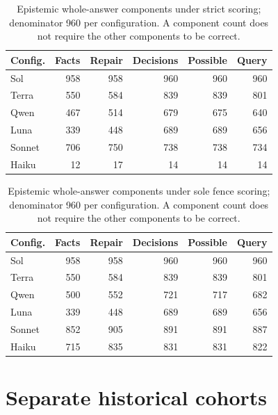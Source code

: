\documentclass[a4paper,preprint,12pt,numbers,nopreprintline]{elsarticle}
\begin{document}
\begin{table}[htbp]\centering\scriptsize
\caption{Epistemic whole-answer components under strict scoring; denominator 960 per configuration. A component count does not require the other components to be correct.}\label{tab:components-epistemic-primary}
\setlength{\tabcolsep}{3pt}
\begin{tabular}{lrrrrr}\toprule
Config. & Facts & Repair & Decisions & Possible & Query\\\midrule
Sol & 958 & 958 & 960 & 960 & 960\\
Terra & 550 & 584 & 839 & 839 & 801\\
Qwen & 467 & 514 & 679 & 675 & 640\\
Luna & 339 & 448 & 689 & 689 & 656\\
Sonnet & 706 & 750 & 738 & 738 & 734\\
Haiku & 12 & 17 & 14 & 14 & 14\\
\bottomrule\end{tabular}
\end{table}
\begin{table}[htbp]\centering\scriptsize
\caption{Epistemic whole-answer components under sole fence scoring; denominator 960 per configuration. A component count does not require the other components to be correct.}\label{tab:components-epistemic-framing_sensitivity}
\setlength{\tabcolsep}{3pt}
\begin{tabular}{lrrrrr}\toprule
Config. & Facts & Repair & Decisions & Possible & Query\\\midrule
Sol & 958 & 958 & 960 & 960 & 960\\
Terra & 550 & 584 & 839 & 839 & 801\\
Qwen & 500 & 552 & 721 & 717 & 682\\
Luna & 339 & 448 & 689 & 689 & 656\\
Sonnet & 852 & 905 & 891 & 891 & 887\\
Haiku & 715 & 835 & 831 & 831 & 822\\
\bottomrule\end{tabular}
\end{table}

\clearpage
\section{Separate historical cohorts}\label{app:historical}
\end{document}
